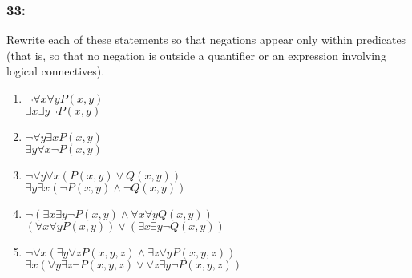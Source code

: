 \documentclass[12pt,en,a4paper]{report}
\begin{document}
	\subsubsection*{33:}
	Rewrite each of these statements so that negations appear only within predicates (that is, so that no negation is outside a quantifier or an expression involving logical connectives).
	\begin{enumerate}[label=\textbf{\alph*)}]
		\item $\neg \forall x \forall y P(x, y)$\\
		$\exists x \exists y \neg P(x, y)$
		\item $\neg \forall y \exists x P(x, y)$\\
		$\exists y \forall x \neg P(x ,y)$
		\item $\neg \forall y \forall x (P(x, y) \vee Q(x, y))$\\
		$\exists y \exists x (\neg P(x, y) \wedge \neg Q(x, y))$
		\item $\neg (\exists x \exists y \neg P(x, y) \wedge \forall x \forall y Q(x, y))$\\
		$(\forall x \forall y P(x, y)) \vee (\exists x \exists y \neg Q(x, y))$
		\item $\neg \forall x (\exists y \forall z P(x, y, z) \wedge \exists z \forall y P(x, y, z))$\\
		$\exists x (\forall y \exists z \neg P(x, y, z) \vee \forall z \exists y \neg P(x, y, z))$
	\end{enumerate}
\end{document}
